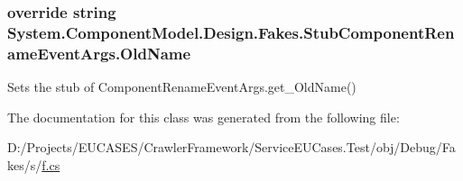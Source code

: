 \hypertarget{class_system_1_1_component_model_1_1_design_1_1_fakes_1_1_stub_component_rename_event_args_abefa07ac2ae80b6fd2601ecf4b2edec5}{
\subsubsection[{Old\-Name}]{\setlength{\rightskip}{0pt plus 5cm}override string System.\-Component\-Model.\-Design.\-Fakes.\-Stub\-Component\-Rename\-Event\-Args.\-Old\-Name\hspace{0.3cm}{\ttfamily [get]}}}\label{class_system_1_1_component_model_1_1_design_1_1_fakes_1_1_stub_component_rename_event_args_abefa07ac2ae80b6fd2601ecf4b2edec5}


Sets the stub of Component\-Rename\-Event\-Args.\-get\-\_\-\-Old\-Name()



The documentation for this class was generated from the following file\-:\begin{DoxyCompactItemize}
\item 
D\-:/\-Projects/\-E\-U\-C\-A\-S\-E\-S/\-Crawler\-Framework/\-Service\-E\-U\-Cases.\-Test/obj/\-Debug/\-Fakes/s/\hyperlink{s_2f_8cs}{f.\-cs}\end{DoxyCompactItemize}
